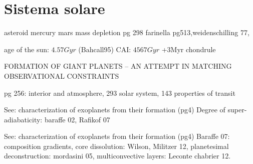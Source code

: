 {\let\clearpage\relax\let\cleardoublepage\relax
\chapter{Sistema solare}
}

\begin{workout}
asteroid mercury mars mass depletion pg 298
farinella pg513,weidenschilling 77,
\end{workout}

\begin{workout}
age of the sun: $4.57Gyr$ (Bahcall95)
CAI: $4567Gyr$ +3Myr chondrule
\end{workout}

\begin{workout}
FORMATION OF GIANT PLANETS – AN ATTEMPT IN MATCHING OBSERVATIONAL CONSTRAINTS
\end{workout}

\begin{workout}

\end{workout}

\begin{workout}
pg 256: interior and atmosphere, 293 solar system, 143 properties of transit
\end{workout}

\begin{workout}
See: characterization of exoplanets from their formation (pg4)
Degree of super-adiabaticity: baraffe 02, Rafikof 07
\end{workout}

\begin{workout}
See: characterization of exoplanets from their formation (pg4)
Baraffe 07: composition gradients, core dissolution: Wilson, Militzer 12, planetesimal deconstruction: mordasini 05, multiconvective layers: Leconte chabrier 12.
\end{workout}

\begin{workout}

\end{workout}

